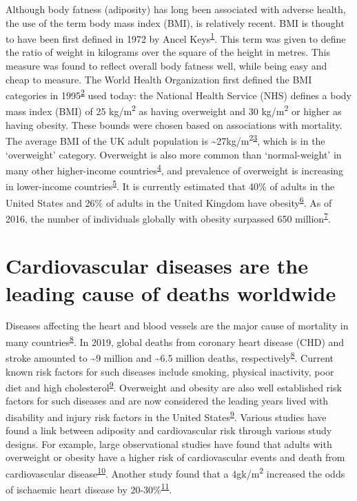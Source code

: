 \documentclass[11pt,twoside]{bristolthesis}
\begin{document}
Although body fatness (adiposity) has long been associated with adverse health, the use of the term body mass index (BMI), is relatively recent. BMI is thought to have been first defined in 1972 by Ancel Keys\textsuperscript{\protect\hyperlink{ref-Blackburn2014}{1}}. This term was given to define the ratio of weight in kilograms over the square of the height in metres. This measure was found to reflect overall body fatness well, while being easy and cheap to measure. The World Health Organization first defined the BMI categories in 1995\textsuperscript{\protect\hyperlink{ref-WHO1995}{2}} used today: the National Health Service (NHS) defines a body mass index (BMI) of 25 kg/m\textsuperscript{2} as having overweight and 30 kg/m\textsuperscript{2} or higher as having obesity. These bounds were chosen based on associations with mortality. The average BMI of the UK adult population is \textasciitilde27kg/m\textsuperscript{2}\textsuperscript{\protect\hyperlink{ref-Wade2018}{3}}, which is in the `overweight' category. Overweight is also more common than `normal-weight' in many other higher-income countries\textsuperscript{\protect\hyperlink{ref-NCD-RisC2016}{4}}, and prevalence of overweight is increasing in lower-income countries\textsuperscript{\protect\hyperlink{ref-Templin2019}{5}}. It is currently estimated that 40\% of adults in the United States and 26\% of adults in the United Kingdom have obesity\textsuperscript{\protect\hyperlink{ref-Bluher2019}{6}}. As of 2016, the number of individuals globally with obesity surpassed 650 million\textsuperscript{\protect\hyperlink{ref-TheLancetPublicHealth2018}{7}}.

\hypertarget{CVD-stats}{%
\section{Cardiovascular diseases are the leading cause of deaths worldwide}\label{CVD-stats}}

Diseases affecting the heart and blood vessels are the major cause of mortality in many countries\textsuperscript{\protect\hyperlink{ref-BritishHeartFoundation2021}{8}}. In 2019, global deaths from coronary heart disease (CHD) and stroke amounted to \textasciitilde9 million and \textasciitilde6.5 million deaths, respectively\textsuperscript{\protect\hyperlink{ref-BritishHeartFoundation2021}{8}}. Current known risk factors for such diseases include smoking, physical inactivity, poor diet and high cholesterol\textsuperscript{\protect\hyperlink{ref-Virani2021}{9}}. Overweight and obesity are also well established risk factors for such diseases and are now considered the leading years lived with disability and injury risk factors in the United States\textsuperscript{\protect\hyperlink{ref-Virani2021}{9}}. Various studies have found a link between adiposity and cardiovascular risk through various study designs. For example, large observational studies have found that adults with overweight or obesity have a higher risk of cardiovascular events and death from cardiovascular disease\textsuperscript{\protect\hyperlink{ref-Khan2018}{10}}. Another study found that a 4gk/m\textsuperscript{2} increased the odds of ischaemic heart disease by 20-30\%\textsuperscript{\protect\hyperlink{ref-Nordestgaard2012}{11}}.
\end{document}

